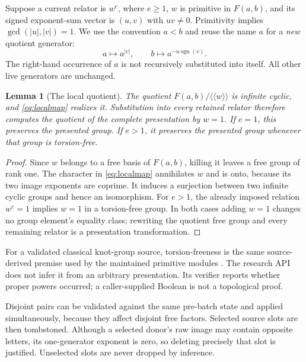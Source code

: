 \documentclass[11pt,letterpaper]{article}
\newtheorem{lemma}[theorem]{Lemma}
\theoremstyle{definition}
\theoremstyle{remark}\newtheorem{remark}[theorem]{Remark}
\newcommand{\sgn}{\operatorname{sgn}}
\begin{document}
Suppose a current relator is $w^e$, where $e\ge1$, $w$ is primitive in
$F(a,b)$, and its signed exponent-sum vector is $(u,v)$ with $uv\ne0$.
Primitivity implies $\gcd(|u|,|v|)=1$. We use the convention $a<b$ and
reuse the name $a$ for a \emph{new} quotient generator:
\begin{equation}
 a\longmapsto a^{|v|},\qquad
 b\longmapsto a^{-u\sgn(v)}.
 \label{eq:localmap}
\end{equation}
The right-hand occurrence of $a$ is not recursively substituted into itself.
All other live generators are unchanged.

\begin{lemma}[The local quotient]
\label{lem:quotient}
The quotient $F(a,b)/\langle\!\langle w\rangle\!\rangle$ is infinite cyclic,
and \eqref{eq:localmap} realizes it. Substitution into every retained relator
therefore computes the quotient of the complete presentation by $w=1$.
If $e=1$, this preserves the presented group. If $e>1$, it preserves the
presented group whenever that group is torsion-free.
\end{lemma}
\begin{proof}
Since $w$ belongs to a free basis of $F(a,b)$, killing it leaves a free group
of rank one. The character in \eqref{eq:localmap} annihilates $w$ and is onto,
because its two image exponents are coprime. It induces a surjection between
two infinite cyclic groups and hence an isomorphism. For $e>1$, the already
imposed relation $w^e=1$ implies $w=1$ in a torsion-free group. In both cases
adding $w=1$ changes no group element's equality class; rewriting the quotient
free group and every remaining relator is a presentation transformation.
\end{proof}

For a validated classical knot-group source, torsion-freeness is the same
source-derived premise used by the maintained primitive modules
\cite{repo-projection,repo-forest}. The research API does not infer it from
an arbitrary presentation. Its verifier reports whether proper powers
occurred; a caller-supplied Boolean is not a topological proof.

Disjoint pairs can be validated against the same pre-batch state and applied
simultaneously, because they affect disjoint free factors. Selected source
slots are then tombstoned. Although a selected donor's raw image may contain
opposite letters, its one-generator exponent is zero, so deleting precisely
that slot is justified. Unselected slots are never dropped by inference.
\end{document}
